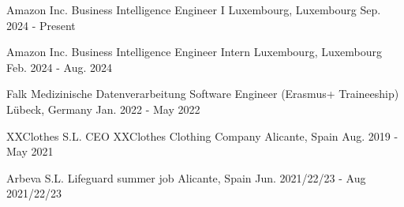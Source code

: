 

\begin{cventries}

  \cventry
		{Amazon Inc.} %
		{Business Intelligence Engineer I} %
		{Luxembourg, Luxembourg} %
		{Sep. 2024 - Present} %
		{}
	
	\cventry
		{Amazon Inc.} %
		{Business Intelligence Engineer Intern} %
		{Luxembourg, Luxembourg} %
		{Feb. 2024 - Aug. 2024} %
		{}
    
  \cventry
	{Falk Medizinische Datenverarbeitung} %
	{Software Engineer (Erasmus+ Traineeship)} %
	{Lübeck, Germany} %
	{Jan. 2022 - May 2022} %
	{}
	
  \cventry
	{XXClothes S.L.} %
	{CEO XXClothes Clothing Company} %
	{Alicante, Spain} %
	{Aug. 2019 - May 2021} %
	{}
	
  \cventry
	{Arbeva S.L.} %
	{Lifeguard summer job} %
	{Alicante, Spain} %
	{Jun. 2021/22/23 - Aug 2021/22/23} %
	{}
\end{cventries}
